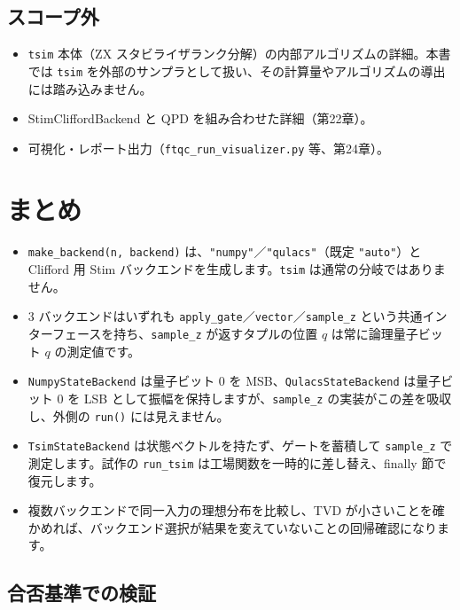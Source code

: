 \subsection{スコープ外}

\begin{itemize}
  \item \texttt{tsim} 本体（ZX スタビライザランク分解）の内部アルゴリズムの詳細。本書では \texttt{tsim} を外部のサンプラとして扱い、その計算量やアルゴリズムの導出には踏み込みません。
  \item StimCliffordBackend と QPD を組み合わせた詳細（第22章）。
  \item 可視化・レポート出力（\texttt{ftqc\_run\_visualizer.py} 等、第24章）。
\end{itemize}

\section{まとめ}\label{ch23:summary}

\begin{itemize}
  \item \texttt{make\_backend(n, backend)} は、\texttt{"numpy"}／\texttt{"qulacs"}（既定 \texttt{"auto"}）と Clifford 用 Stim バックエンドを生成します。\texttt{tsim} は通常の分岐ではありません。
  \item 3 バックエンドはいずれも \texttt{apply\_gate}／\texttt{vector}／\texttt{sample\_z} という共通インターフェースを持ち、\texttt{sample\_z} が返すタプルの位置 $q$ は常に論理量子ビット $q$ の測定値です。
  \item \texttt{NumpyStateBackend} は量子ビット $0$ を MSB、\texttt{QulacsStateBackend} は量子ビット $0$ を LSB として振幅を保持しますが、\texttt{sample\_z} の実装がこの差を吸収し、外側の \texttt{run()} には見えません。
  \item \texttt{TsimStateBackend} は状態ベクトルを持たず、ゲートを蓄積して \texttt{sample\_z} で測定します。試作の \texttt{run\_tsim} は工場関数を一時的に差し替え、finally 節で復元します。
  \item 複数バックエンドで同一入力の理想分布を比較し、TVD が小さいことを確かめれば、バックエンド選択が結果を変えていないことの回帰確認になります。
\end{itemize}

\subsection*{合否基準での検証}

